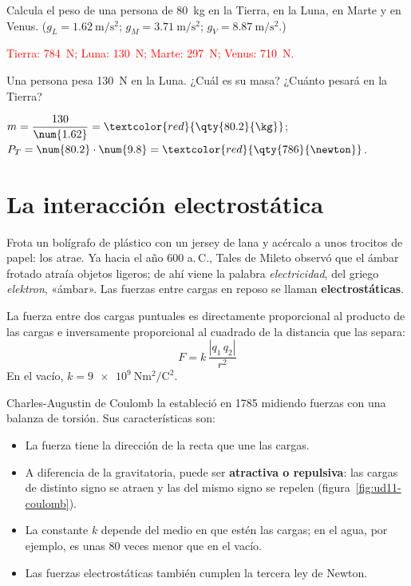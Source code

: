 \begin{exercise}
    Calcula el peso de una persona de \qty{80}{\kg} en la Tierra, en la Luna, en Marte y en Venus. (\(g_L = \qty{1.62}{\m\per\s\squared}\);
    \(g_M = \qty{3.71}{\m\per\s\squared}\); \(g_V = \qty{8.87}{\m\per\s\squared}\).)
    \begin{solu}
        \textcolor{red}{Tierra: \qty{784}{\newton}; Luna: \qty{130}{\newton}; Marte: \qty{297}{\newton}; Venus: \qty{710}{\newton}.}
    \end{solu}
\end{exercise}

\begin{exercise}
    Una persona pesa \qty{130}{\newton} en la Luna. ¿Cuál es su masa? ¿Cuánto pesará en la Tierra?
    \begin{solu}
        \(m = \dfrac{130}{\num{1.62}} = \textcolor{red}{\qty{80.2}{\kg}}\); \(P_T = \num{80.2} \cdot \num{9.8} = \textcolor{red}{\qty{786}{\newton}}\).
    \end{solu}
\end{exercise}

\section{La interacción electrostática}\label{sec:ud11-electrostatica}

Frota un bolígrafo de plástico con un jersey de lana y acércalo a unos trocitos de papel: los atrae. Ya hacia el año 600 a.\,C., Tales
de Mileto observó que el ámbar frotado atraía objetos ligeros; de ahí viene la palabra \textit{electricidad}, del griego
\textit{elektron}, «ámbar». Las fuerzas entre cargas en reposo se llaman \textbf{electrostáticas}.

\begin{definition}
    La fuerza entre dos cargas puntuales es directamente proporcional al producto de las cargas e inversamente proporcional al
    cuadrado de la distancia que las separa:
    \[ F = k\,\frac{|q_1\,q_2|}{r^2} \]
    En el vacío, \(k = \qty{9e9}{\newton\m\squared\per\coulomb\squared}\).
\end{definition}

Charles-Augustin de Coulomb la estableció en 1785 midiendo fuerzas con una balanza de torsión. Sus características son:
\begin{itemize}
    \item La fuerza tiene la dirección de la recta que une las cargas.
    \item A diferencia de la gravitatoria, puede ser \textbf{atractiva o repulsiva}: las cargas de distinto signo se atraen y las del
    mismo signo se repelen (figura~\ref{fig:ud11-coulomb}).
    \item La constante \(k\) depende del medio en que estén las cargas; en el agua, por ejemplo, es unas 80 veces menor que en el vacío.
    \item Las fuerzas electrostáticas también cumplen la tercera ley de Newton.
\end{itemize}

